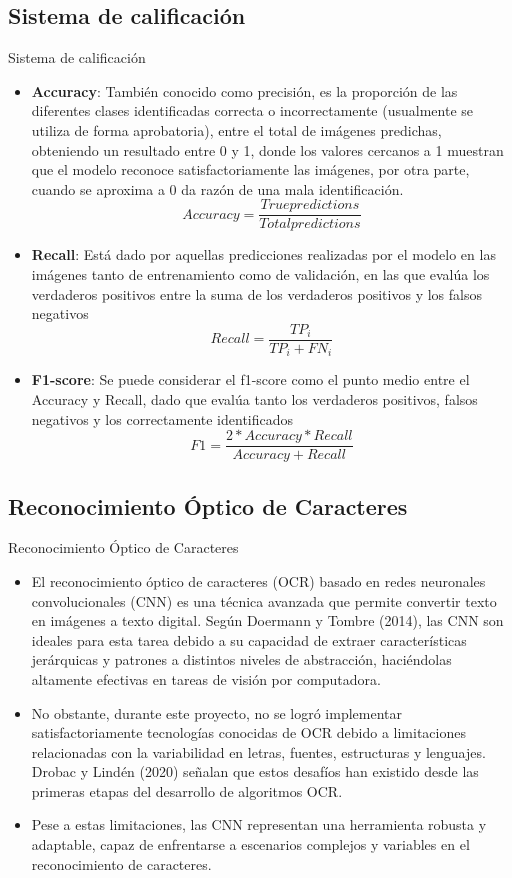 \documentclass{beamer}
\begin{document}
\subsection{Sistema de calificación}
\begin{frame}{Sistema de calificación}
    \begin{itemize}
        \item \textbf{Accuracy}: También conocido como precisión, es la proporción de las diferentes clases identificadas correcta o incorrectamente (usualmente se utiliza de forma aprobatoria), entre el total de imágenes predichas, obteniendo un resultado entre 0 y 1, donde los valores cercanos a 1 muestran que el modelo reconoce satisfactoriamente las imágenes, por otra parte, cuando se aproxima a 0 da razón de una mala identificación.    
        \[
        Accuracy = \frac{True predictions}{Total predictions}
        \]
        \item \textbf{Recall}: Está dado por aquellas predicciones realizadas por el modelo en las imágenes tanto de entrenamiento como de validación, en las que evalúa los verdaderos positivos entre la suma de los verdaderos positivos y los falsos negativos
        \[
        Recall = \frac{TP_i}{TP_i+FN_i}
        \]
        \item \textbf{F1-score}: Se puede considerar el f1-score como el punto medio entre el Accuracy y Recall, dado que evalúa tanto los verdaderos positivos, falsos negativos y los correctamente identificados
        \[
        F1 = \frac{2*Accuracy*Recall}{Accuracy+Recall}
        \]
    \end{itemize}
\end{frame}

\subsection{Reconocimiento Óptico de Caracteres}
\begin{frame}{Reconocimiento Óptico de Caracteres}
    \begin{itemize}
        \item El reconocimiento óptico de caracteres (OCR) basado en redes neuronales convolucionales (CNN) es una técnica avanzada que permite convertir texto en imágenes a texto digital. Según Doermann y Tombre (2014), las CNN son ideales para esta tarea debido a su capacidad de extraer características jerárquicas y patrones a distintos niveles de abstracción, haciéndolas altamente efectivas en tareas de visión por computadora.
        \item No obstante, durante este proyecto, no se logró implementar satisfactoriamente tecnologías conocidas de OCR debido a limitaciones relacionadas con la variabilidad en letras, fuentes, estructuras y lenguajes. Drobac y Lindén (2020) señalan que estos desafíos han existido desde las primeras etapas del desarrollo de algoritmos OCR.
        \item Pese a estas limitaciones, las CNN representan una herramienta robusta y adaptable, capaz de enfrentarse a escenarios complejos y variables en el reconocimiento de caracteres.
        
    \end{itemize}
\end{frame}
\end{document}
